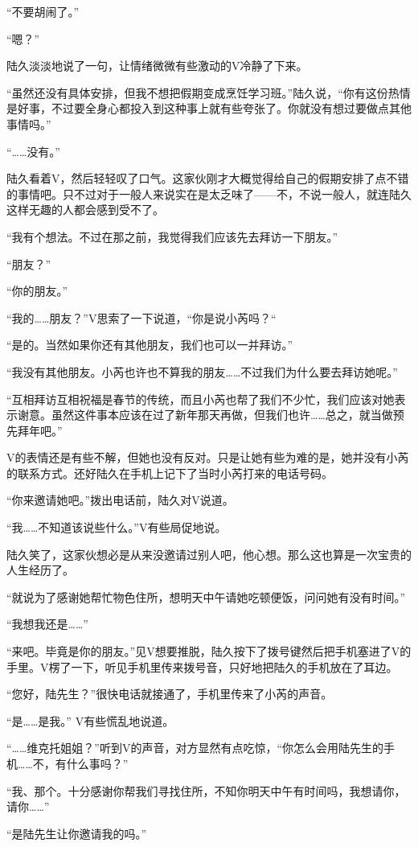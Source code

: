 “不要胡闹了。”

“嗯？”

陆久淡淡地说了一句，让情绪微微有些激动的V冷静了下来。

“虽然还没有具体安排，但我不想把假期变成烹饪学习班。”陆久说，“你有这份热情是好事，不过要全身心都投入到这种事上就有些夸张了。你就没有想过要做点其他事情吗。”

“……没有。”

陆久看着V，然后轻轻叹了口气。这家伙刚才大概觉得给自己的假期安排了点不错的事情吧。只不过对于一般人来说实在是太乏味了——不，不说一般人，就连陆久这样无趣的人都会感到受不了。

“我有个想法。不过在那之前，我觉得我们应该先去拜访一下朋友。”

“朋友？”

“你的朋友。”

“我的……朋友？”V思索了一下说道，“你是说小芮吗？“

“是的。当然如果你还有其他朋友，我们也可以一并拜访。”

“我没有其他朋友。小芮也许也不算我的朋友……不过我们为什么要去拜访她呢。”

“互相拜访互相祝福是春节的传统，而且小芮也帮了我们不少忙，我们应该对她表示谢意。虽然这件事本应该在过了新年那天再做，但我们也许……总之，就当做预先拜年吧。”

V的表情还是有些不解，但她也没有反对。只是让她有些为难的是，她并没有小芮的联系方式。还好陆久在手机上记下了当时小芮打来的电话号码。

“你来邀请她吧。”拨出电话前，陆久对V说道。

“我……不知道该说些什么。”V有些局促地说。

陆久笑了，这家伙想必是从来没邀请过别人吧，他心想。那么这也算是一次宝贵的人生经历了。

“就说为了感谢她帮忙物色住所，想明天中午请她吃顿便饭，问问她有没有时间。”

“我想我还是……”

“来吧。毕竟是你的朋友。”见V想要推脱，陆久按下了拨号键然后把手机塞进了V的手里。V楞了一下，听见手机里传来拨号音，只好地把陆久的手机放在了耳边。

“您好，陆先生？”很快电话就接通了，手机里传来了小芮的声音。

“是……是我。” V有些慌乱地说道。

“……维克托姐姐？”听到V的声音，对方显然有点吃惊，“你怎么会用陆先生的手机……不，有什么事吗？”

“我、那个。十分感谢你帮我们寻找住所，不知你明天中午有时间吗，我想请你，请你……”

“是陆先生让你邀请我的吗。”

